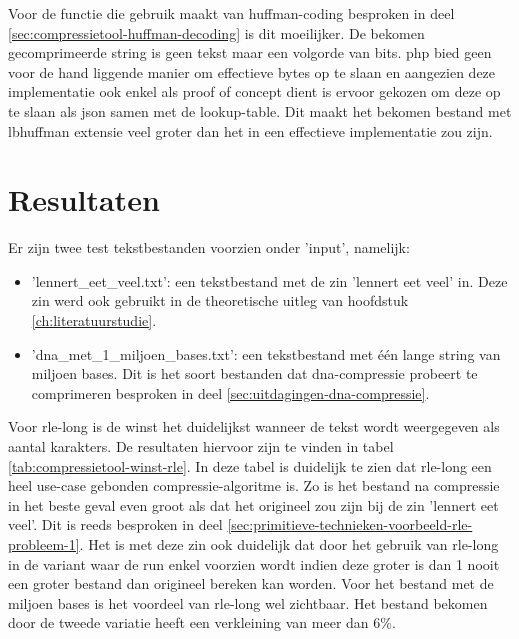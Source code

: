 Voor de functie die gebruik maakt van \gls{huffman-coding} besproken in deel \ref{sec:compressietool-huffman-decoding} is dit moeilijker. De bekomen gecomprimeerde \gls{string} is geen tekst maar een volgorde van \glspl{bit}. \Gls{php} bied geen voor de hand liggende manier om effectieve bytes op te slaan en aangezien deze implementatie ook enkel als proof of concept dient is ervoor gekozen om deze op te slaan als \gls{json} samen met de \gls{lookup-table}. Dit maakt het bekomen bestand met \gls{lbhuffman} extensie veel groter dan het in een effectieve implementatie zou zijn.

\section{Resultaten}
\label{sec:compressietool-resultaten}

Er zijn twee test tekstbestanden voorzien onder 'input', namelijk:

\begin{itemize}
	\item 'lennert\_eet\_veel.txt': een tekstbestand met de zin 'lennert eet veel' in. Deze zin werd ook gebruikt in de theoretische uitleg van hoofdstuk \ref{ch:literatuurstudie}.
	
	\item 'dna\_met\_1\_miljoen\_bases.txt': een tekstbestand met één lange \gls{string} van miljoen bases. Dit is het soort bestanden dat \gls{dna-compressie} probeert te comprimeren besproken in deel \ref{sec:uitdagingen-dna-compressie}.
\end{itemize}

Voor \gls{rle-long} is de winst het duidelijkst wanneer de tekst wordt weergegeven als aantal karakters. De resultaten hiervoor zijn te vinden in tabel \ref{tab:compressietool-winst-rle}. In deze tabel is duidelijk te zien dat \gls{rle-long} een heel \gls{use-case} gebonden \gls{compressie-algoritme} is. Zo is het bestand na compressie in het beste geval even groot als dat het origineel zou zijn bij de zin 'lennert eet veel'. Dit is reeds besproken in deel \ref{sec:primitieve-technieken-voorbeeld-rle-probleem-1}. Het is met deze zin ook duidelijk dat door het gebruik van \gls{rle-long} in de variant waar de run enkel voorzien wordt indien deze groter is dan 1 nooit een groter bestand dan origineel bereken kan worden. Voor het bestand met de miljoen bases is het voordeel van \gls{rle-long} wel zichtbaar. Het bestand bekomen door de tweede variatie heeft een verkleining van meer dan 6\%.

